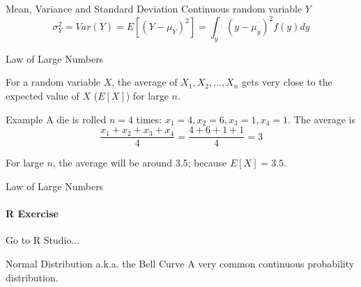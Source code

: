 \documentclass{beamer}\usepackage[]{graphicx}\usepackage[]{color}
\begin{document}
\begin{darkframes}
\begin{frame}[label=lists]{Mean, Variance and Standard Deviation}
        	Continuous random variable $Y$
        	$$
				\sigma^2_Y = Var(Y) = E[(Y-\mu_Y)^2] = \int_y (y-\mu_y)^2 f(y)dy	        	
        	$$
   			
	\end{frame}





	\begin{frame}[label=lists]{Law of Large Numbers}
		
		\begin{definition}
			For a random variable $X$, the average of $X_1, X_2,\ldots,X_n$ gets very close to the expected value of $X$ ($E[X]$) for large $n$.
		\end{definition}  \pause
		
		
		\begin{exampleblock}{Example}
			A die is rolled $n=4$ times: $x_1=4, x_2=6, x_3=1, x_4=1$. The average is
			$$
				\frac{x_1 + x_2 + x_3 + x_4}{4} = \frac{4+6+1+1}{4}=3
			$$
		\end{exampleblock}  \pause
		
		For large $n$, the average will be around 3.5; because $E[X]=3.5$.
   			
	\end{frame}
	
	
	 
	
	
	
	
	\begin{frame}[label=lists]{Law of Large Numbers}
		\framesubtitle{R Exercise} 
		Go to R Studio...
		
		\rollRie
   			
	\end{frame}




	\begin{frame}[label=lists]{Normal Distribution a.k.a. the Bell Curve}
		A very common continuous probability distribution. 


\end{frame}
\end{darkframes}
\end{document}

